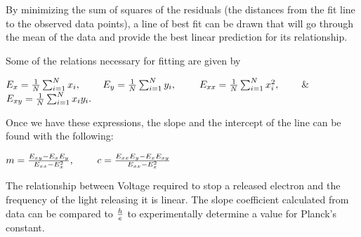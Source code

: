 \documentclass[11pt]{article}
\begin{document}
By minimizing the sum of squares of the residuals (the distances from
the fit line to the observed data points), a line of best fit can be
drawn that will go through the mean of the data and provide the best
linear prediction for its relationship.

Some of the relations necessary for fitting are given by

\(E_x = {1\over N} \sum_{i=1}^N x_i,\qquad\)
\(E_y = {1\over N} \sum_{i=1}^N y_i,\qquad\)
\(E_{xx} = {1\over N} \sum_{i=1}^N x_i^2,\qquad\) \&
\(E_{xy} = {1\over N} \sum_{i=1}^N x_iy_i.\)

Once we have these expressions, the slope and the intercept of the line
can be found with the following:

\(m = {E_{xy}-E_x E_y\over E_{xx} - E_x^2},\qquad\)
\(c = {E_{xx}E_y-E_x E_{xy}\over E_{xx} - E_x^2}\)

The relationship between Voltage required to stop a released electron
and the frequency of the light releasing it is linear. The slope
coefficient calculated from data can be compared to \(h \over e\) to
experimentally determine a value for Planck's constant.
\end{document}

